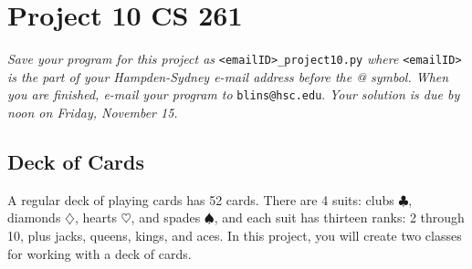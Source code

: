 \documentclass[12pt]{article}
\begin{document}
\section*{Project 10 \hfill CS 261}

\textit{Save your program for this project as} \verb|<emailID>_project10.py| \textit{where} \verb|<emailID>| \textit{is the part of your Hampden-Sydney e-mail address before the @ symbol. When you are finished, e-mail your program to} \verb|blins@hsc.edu|. \textit{Your solution is due by noon on Friday, November 15. }

\subsection*{Deck of Cards}

A regular deck of playing cards has 52 cards.  There are 4 suits: clubs $\clubsuit$, diamonds $\diamondsuit$, hearts $\heartsuit$, and spades $\spadesuit$, and each suit has thirteen ranks: 2 through 10, plus jacks, queens, kings, and aces.  In this project, you will create two classes for working with a deck of cards.  
\end{document}
